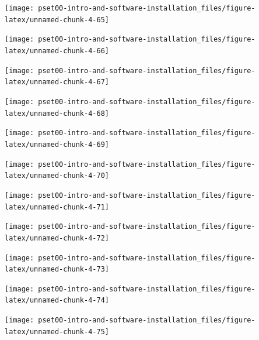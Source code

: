 \documentclass[
]{article}
\begin{document}
\begin{center}\texttt{[image: pset00-intro-and-software-installation\_files/figure-latex/unnamed-chunk-4-65]} \end{center}

\begin{center}\texttt{[image: pset00-intro-and-software-installation\_files/figure-latex/unnamed-chunk-4-66]} \end{center}

\begin{center}\texttt{[image: pset00-intro-and-software-installation\_files/figure-latex/unnamed-chunk-4-67]} \end{center}

\begin{center}\texttt{[image: pset00-intro-and-software-installation\_files/figure-latex/unnamed-chunk-4-68]} \end{center}

\begin{center}\texttt{[image: pset00-intro-and-software-installation\_files/figure-latex/unnamed-chunk-4-69]} \end{center}

\begin{center}\texttt{[image: pset00-intro-and-software-installation\_files/figure-latex/unnamed-chunk-4-70]} \end{center}

\begin{center}\texttt{[image: pset00-intro-and-software-installation\_files/figure-latex/unnamed-chunk-4-71]} \end{center}

\begin{center}\texttt{[image: pset00-intro-and-software-installation\_files/figure-latex/unnamed-chunk-4-72]} \end{center}

\begin{center}\texttt{[image: pset00-intro-and-software-installation\_files/figure-latex/unnamed-chunk-4-73]} \end{center}

\begin{center}\texttt{[image: pset00-intro-and-software-installation\_files/figure-latex/unnamed-chunk-4-74]} \end{center}

\begin{center}\texttt{[image: pset00-intro-and-software-installation\_files/figure-latex/unnamed-chunk-4-75]} \end{center}
\end{document}
